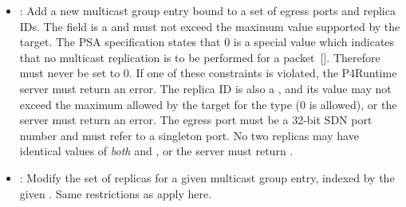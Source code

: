 \documentclass[11pt]{article}
\begin{document}
{\begin{itemize}[noitemsep,topsep=\mdcompacttopsep]
\item{}: Add a new multicast group entry bound to a set of egress ports and
replica IDs. The  field is a  and must not exceed
the maximum value supported by the target. The PSA specification states that 0
is a special value which indicates that no multicast replication is to be
performed for a packet~[]. Therefore  must
never be set to 0. If one of these constraints is violated, the P4Runtime
server must return an  error. The replica  ID is
also a , and its value may not exceed the maximum allowed by the
target for the  type (0 is allowed), or the server must
return an  error. The egress port must be a 32-bit SDN port
number and must refer to a singleton port. No two replicas may have identical
values of \emph{both}  and , or the server must return
.%

\item{}: Modify the set of replicas for a given multicast group entry,
indexed by the given . Same restrictions as  apply
here.%


\end{itemize}}
\end{document}

